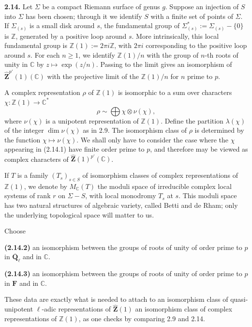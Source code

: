 \documentclass[11pt]{article}
\newcommand{\F}{\mathbf{F}}
\newcommand{\Qbl}{\overline{\mathbf{Q}}_{\ell}}
\newcommand{\Z}{\mathbb{Z}}
\newcommand{\Zhat}{\widehat{\mathbf{Z}}}
\newcommand{\C}{\mathbb{C}}
\newcommand{\para}[1]{\medskip\noindent\textbf{#1}\enspace}
\begin{document}
\para{2.14.} Let \(\Sigma\) be a compact Riemann surface of genus \(g\). Suppose an injection of \(S\) into \(\Sigma\) has been chosen; through it we identify \(S\) with a finite set of points of \(\Sigma\). If \(\Sigma_{(s)}\) is a small disk around \(s\), the fundamental group of \(\Sigma^*_{(s)}:=\Sigma_{(s)}-\{0\}\) is \(\Z\), generated by a positive loop around \(s\). More intrinsically, this local fundamental group is \(\Z(1):=2\pi i\Z\), with \(2\pi i\) corresponding to the positive loop around \(s\). For each \(n\geq 1\), we identify \(\Z(1)/n\) with the group of \(n\)-th roots of unity in \(\C\) by \(z\mapsto\exp(z/n)\). Passing to the limit gives an isomorphism of \(\Zhat^{p'}(1)(\C)\) with the projective limit of the \(\Z(1)/n\) for \(n\) prime to \(p\).

A complex representation \(\rho\) of \(\Z(1)\) is isomorphic to a sum over characters \(\chi:\Z(1)\to\C^*\)
\begin{equation}
\rho\sim\bigoplus \chi\otimes \nu(\chi),
\tag{2.14.1}
\end{equation}
where \(\nu(\chi)\) is a unipotent representation of \(\Z(1)\). Define the partition \(\lambda(\chi)\) of the integer \(\dim \nu(\chi)\) as in 2.9. The isomorphism class of \(\rho\) is determined by the function \(\chi\mapsto\nu(\chi)\). We shall only have to consider the case where the \(\chi\) appearing in (2.14.1) have finite order prime to \(p\), and therefore may be viewed as complex characters of \(\Zhat(1)^{p'}(\C)\).

If \(T\) is a family \((T_s)_{s\in S}\) of isomorphism classes of complex representations of \(\Z(1)\), we denote by \(M_\C(T)\) the moduli space of irreducible complex local systems of rank \(r\) on \(\Sigma-S\), with local monodromy \(T_s\) at \(s\). This moduli space has two natural structures of algebraic variety, called Betti and de Rham; only the underlying topological space will matter to us.

Choose

\para{(2.14.2)} an isomorphism between the groups of roots of unity of order prime to \(p\) in \(\Qbl\) and in \(\C\).

\para{(2.14.3)} an isomorphism between the groups of roots of unity of order prime to \(p\) in \(\F\) and in \(\C\).

These data are exactly what is needed to attach to an isomorphism class of quasi-unipotent \(\ell\)-adic representations of \(\Zhat(1)\) an isomorphism class of complex representations of \(\Z(1)\), as one checks by comparing 2.9 and 2.14.
\end{document}
